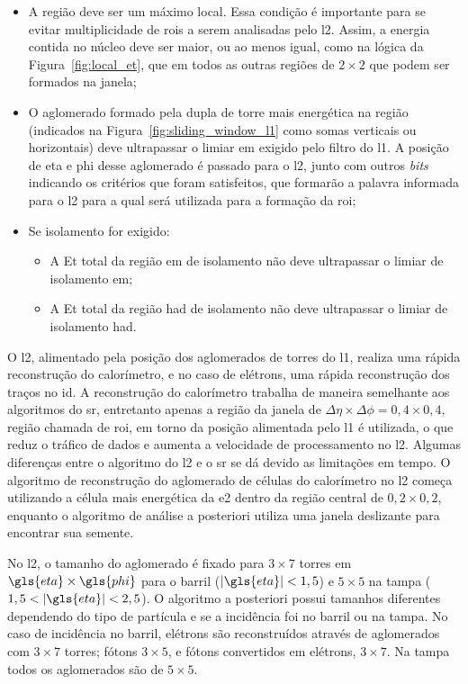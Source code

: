 \begin{itemize}
\item A região deve ser um máximo local. Essa condição é importante para se
evitar multiplicidade de \glspl{roi} a serem analisadas pelo \gls{l2}.
Assim, a energia contida no núcleo deve ser
maior, ou ao menos igual, como na lógica da Figura~\ref{fig:local_et}, 
que em todos as outras regiões de $2\times2$ que podem ser formados na
janela;
\item O aglomerado formado pela dupla de torre mais energética na região
(indicados na Figura~\ref{fig:sliding_window_l1} como somas verticais ou horizontais) deve ultrapassar o limiar
\gls{em} exigido pelo filtro do \gls{l1}. A posição de \gls{eta} e \gls{phi} desse aglomerado é passado
para o \gls{l2}, junto com outros \emph{bits} indicando os critérios que foram
satisfeitos, que formarão a palavra informada para o \gls{l2} para a qual será
utilizada para a formação da \gls{roi};
\item Se isolamento for exigido: 
\begin{itemize}
\item A \gls{Et} total da região \gls{em} de
isolamento não deve ultrapassar o limiar de isolamento \gls{em};
\item A \gls{Et} total da região \gls{had} de isolamento não deve ultrapassar o
limiar de isolamento \gls{had}.
\end{itemize}
\end{itemize}


O \gls{l2}, alimentado pela posição dos
aglomerados de torres do \gls{l1}, realiza uma rápida reconstrução do
calorímetro, e no caso de elétrons, uma rápida reconstrução dos traços no \gls{id}. A
reconstrução do calorímetro trabalha de maneira semelhante aos algoritmos do
\gls{sr}, entretanto apenas a região da janela de $\Delta\eta\times\Delta\phi =
0,4 \times 0,4$, região chamada de \gls{roi}, em torno da posição alimentada pelo \gls{l1} 
é utilizada, o que reduz o tráfico de dados e aumenta a velocidade de processamento no \gls{l2}.
Algumas diferenças entre o algoritmo do \gls{l2} e o \gls{sr} se dá devido as
limitações em tempo. O algoritmo de reconstrução do aglomerado de
células do calorímetro no \gls{l2} começa utilizando a célula mais energética da
\gls{e2} dentro da região central de $0,2 \times 0,2$, enquanto o
algoritmo de análise a posteriori utiliza uma janela deslizante para encontrar
sua semente.

No \gls{l2}, o tamanho do aglomerado é fixado para $3
\times 7$ torres em $\gls{eta} \times \gls{phi}$ para o barril ($|\gls{eta}|<1,5$) e 
$5 \times 5$ na tampa ($1,5<|\gls{eta}|<2,5$). O algoritmo a posteriori possui
tamanhos diferentes dependendo do tipo de partícula e se a incidência foi no
barril ou na tampa. No caso de incidência no barril, elétrons são reconstruídos
através de aglomerados com $3\times7$ torres; fótons $3\times5$, 
e fótons convertidos em elétrons, $3\times7$. Na tampa todos os aglomerados 
são de $5\times5$.

